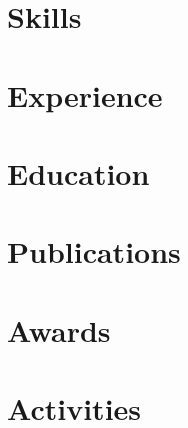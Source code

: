 \documentclass[letter,10pt]{article}
\begin{document}


\section{Skills}


\section{Experience}


\newpage
\section{Education}


\section{Publications}


\section{Awards}


\section{Activities}

\end{document}

